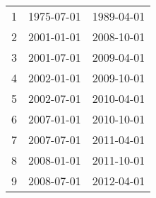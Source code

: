 % 
\begin{tabular}{ccc}
  \hline
  \hline
1 & 1975-07-01 & 1989-04-01 \\ 
  2 & 2001-01-01 & 2008-10-01 \\ 
  3 & 2001-07-01 & 2009-04-01 \\ 
  4 & 2002-01-01 & 2009-10-01 \\ 
  5 & 2002-07-01 & 2010-04-01 \\ 
  6 & 2007-01-01 & 2010-10-01 \\ 
  7 & 2007-07-01 & 2011-04-01 \\ 
  8 & 2008-01-01 & 2011-10-01 \\ 
  9 & 2008-07-01 & 2012-04-01 \\ 
   \hline
\end{tabular}
